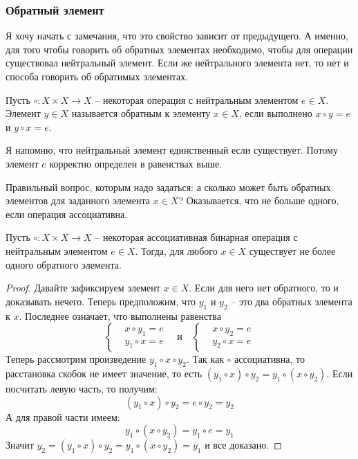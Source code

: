 \subsubsection{Обратный элемент}

Я хочу начать с замечания, что это свойство зависит от предыдущего.
А именно, для того чтобы говорить об обратных элементах необходимо, чтобы для операции существовал нейтральный элемент.
Если же нейтрального элемента нет, то нет и способа говорить об обратимых элементах.

\begin{definition}
Пусть $\circ \colon X\times X\to X$ -- некоторая операция с нейтральным элементом $e\in X$.
Элемент $y\in X$ называется обратным к элементу  $x\in X$, если выполнено $x \circ y = e$ и $y \circ x = e$.
\end{definition}

Я напомню, что нейтральный элемент единственный если существует.
Потому элемент $e$ корректно определен в  равенствах выше.

Правильный вопрос, которым надо задаться: а сколько может быть обратных элементов для заданного элемента $x\in X$?
Оказывается, что не больше одного, если операция ассоциативна.

\begin{claim}
Пусть $\circ \colon X\times X \to X$ -- некоторая ассоциативная бинарная операция с нейтральным элементом $e\in X$.
Тогда, для любого $x \in X$ существует не более одного обратного элемента.
\end{claim}
\begin{proof}
Давайте зафиксируем элемент $x\in X$.
Если для него нет обратного, то и доказывать нечего.
Теперь предположим, что $y_1$ и $y_2$ -- это два обратных элемента к $x$.
Последнее означает, что выполнены равенства
\[
\left\{
\begin{aligned}
&x \circ y_1 = e\\
&y_1 \circ x = e
\end{aligned}
\right.
\quad\text{и}\quad
\left\{
\begin{aligned}
&x \circ y_2 = e\\
&y_2 \circ x = e
\end{aligned}
\right.
\]
Теперь рассмотрим произведение $y_1 \circ x \circ y_2$.
Так как $\circ$ ассоциативна, то расстановка скобок не имеет значение, то есть $(y_1 \circ x) \circ y_2 = y_1 \circ (x \circ y_2)$.
Если посчитать левую часть, то получим:
\[
(y_1 \circ x) \circ y_2 = e \circ y_2 = y_2
\]
А для правой части имеем:
\[
y_1 \circ (x \circ y_2) = y_1 \circ e = y_1
\]
Значит $y_2 = (y_1 \circ x) \circ y_2 = y_1 \circ (x \circ y_2) = y_1$ и все доказано.
\end{proof}

